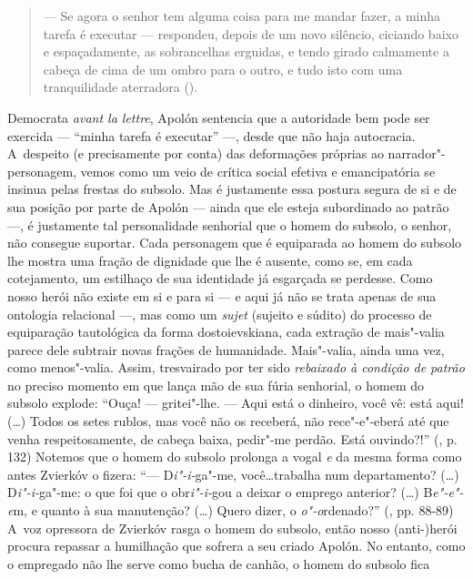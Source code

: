 \begin{quote}
--- Se agora o senhor tem alguma coisa para me mandar fazer, a minha
tarefa é executar --- respondeu, depois de um novo silêncio, ciciando
baixo e espaçadamente, as sobrancelhas erguidas, e tendo girado
calmamente a cabeça de cima de um ombro para o outro, e tudo isto com
uma tranquilidade aterradora ().
\end{quote}

Democrata \emph{avant la lettre}, Apolón sentencia que a autoridade bem
pode ser exercida --- ``minha tarefa é executar'' ---, desde que não haja
autocracia. A~despeito (e precisamente por conta) das deformações
próprias ao narrador"-personagem, vemos como um veio de crítica social
efetiva e emancipatória se insinua pelas frestas do subsolo. Mas é
justamente essa postura segura de si e de sua posição por parte de
Apolón --- ainda que ele esteja subordinado ao patrão ---, é justamente
tal personalidade senhorial que o homem do subsolo, o senhor, não
consegue suportar. Cada personagem que é equiparada ao homem do subsolo
lhe mostra uma fração de dignidade que lhe é ausente, como se, em cada
cotejamento, um estilhaço de sua identidade já esgarçada se perdesse.
Como nosso herói não existe em si e para si --- e aqui já não se trata
apenas de sua ontologia relacional ---, mas como um \emph{sujet} (sujeito
e súdito) do processo de equiparação tautológica da forma
dostoievskiana, cada extração de mais"-valia parece dele subtrair novas
frações de humanidade. Mais"-valia, ainda uma vez, como menos"-valia.
Assim, tresvairado por ter sido \emph{rebaixado à condição de patrão} no
preciso momento em que lança mão de sua fúria senhorial, o homem do
subsolo explode: ``Ouça! --- gritei"-lhe. --- Aqui está o dinheiro, você
vê: está aqui! (\ldots) Todos os setes rublos, mas você não os receberá,
não rece"-e"-eberá até que venha respeitosamente, de cabeça baixa,
pedir"-me perdão. Está ouvindo?!'' (, p. 132) Notemos que o homem do
subsolo prolonga a vogal \emph{e} da mesma forma como antes Zvierkóv o
fizera: ``--- D\emph{i"-i-}ga"-me, você\ldots trabalha num departamento? (\ldots)
D\emph{i"-i-}ga"-me: o que foi que o obr\emph{i"-i-}gou a deixar o emprego
anterior? (\ldots) B\emph{e"-e"-e}m, e quanto à sua manutenção? (\ldots) Quero
dizer, o \emph{o"-o}rdenado?'' (, pp. 88-89) A~voz opressora de
Zvierkóv rasga o homem do subsolo, então nosso \mbox{(anti-)herói} procura
repassar a humilhação que sofrera a seu criado Apolón. No entanto, como
o empregado não lhe serve como bucha de canhão, o homem do subsolo fica
